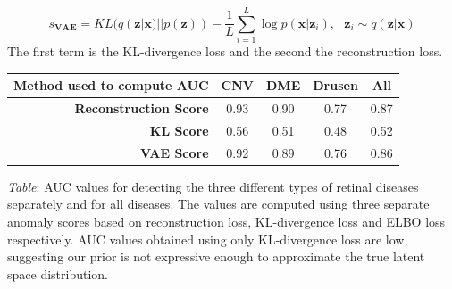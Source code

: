 \documentclass[portrait,final,a0paper,fontscale=0.32]{baposter}
\begin{document}
\begin{poster}
{\begin{center}
\begin{minipage}{0.95\linewidth}
     $$
     s_{\mathbf{VAE}} = KL(q(\mathbf{z}|\mathbf{x})||p(\mathbf{z})) - \frac{1}{L}\sum_{i=1}^L\log p(\mathbf{x}|\mathbf{z}_i), \,\,\,\,\mathbf{z}_i\sim q(\mathbf{z}|\mathbf{x})
     $$
     The first term is the KL-divergence loss and the second the reconstruction loss. 
    \vspace{2mm}
     \end{minipage}

    \begin{minipage}{0.95\linewidth}
    \begin{center}
    \begin{tabular}{r|c|c|c|c}
    
    \textbf{Method used to compute AUC} & \textbf{CNV} & \textbf{DME} & \textbf{Drusen} & \textbf{All} \\
    \hline
    \textbf{Reconstruction Score} & 0.93 & 0.90 & 0.77 & 0.87 \\
    \hline
    \textbf{KL Score} & 0.56 & 0.51 & 0.48 & 0.52 \\
    \hline
    \textbf{VAE Score} & 0.92 & 0.89 & 0.76 & 0.86  
    \end{tabular} 
    \end{center}
    \textit{Table}: AUC values for detecting the three different types of retinal diseases separately and for all diseases. The values are computed using three separate anomaly scores based on reconstruction loss, KL-divergence loss and ELBO loss respectively.
    AUC values obtained using only KL-divergence loss are low, suggesting our prior is not expressive enough to approximate the true latent space distribution.
    \vspace{2mm}
    \end{minipage}
    
    \end{center} 
  }
 
\end{poster}
\end{document}
